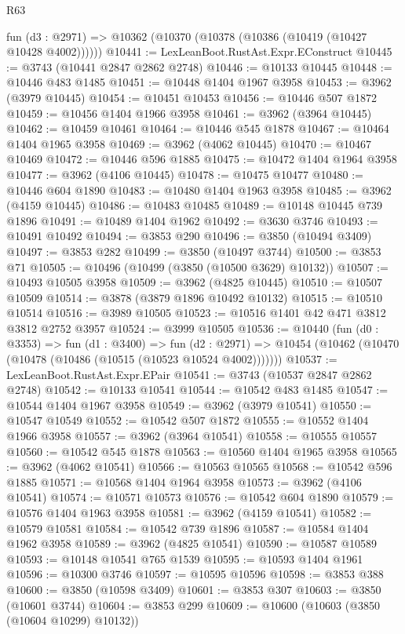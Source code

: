 \begin{lexlean}{R63}
\begin{coremodule}
    fun (d3 : @2971) => @10362 (@10370 (@10378 (@10386 (@10419 (@10427 @10428 @4002))))))
@10441 := LexLeanBoot.RustAst.Expr.EConstruct
@10445 := @3743 (@10441 @2847 @2862 @2748)
@10446 := @10133 @10445
@10448 := @10446 @483 @1485
@10451 := @10448 @1404 @1967 @3958
@10453 := @3962 (@3979 @10445)
@10454 := @10451 @10453
@10456 := @10446 @507 @1872
@10459 := @10456 @1404 @1966 @3958
@10461 := @3962 (@3964 @10445)
@10462 := @10459 @10461
@10464 := @10446 @545 @1878
@10467 := @10464 @1404 @1965 @3958
@10469 := @3962 (@4062 @10445)
@10470 := @10467 @10469
@10472 := @10446 @596 @1885
@10475 := @10472 @1404 @1964 @3958
@10477 := @3962 (@4106 @10445)
@10478 := @10475 @10477
@10480 := @10446 @604 @1890
@10483 := @10480 @1404 @1963 @3958
@10485 := @3962 (@4159 @10445)
@10486 := @10483 @10485
@10489 := @10148 @10445 @739 @1896
@10491 := @10489 @1404 @1962
@10492 := @3630 @3746
@10493 := @10491 @10492
@10494 := @3853 @290
@10496 := @3850 (@10494 @3409)
@10497 := @3853 @282
@10499 := @3850 (@10497 @3744)
@10500 := @3853 @71
@10505 := @10496 (@10499 (@3850 (@10500 @3629) @10132))
@10507 := @10493 @10505 @3958
@10509 := @3962 (@4825 @10445)
@10510 := @10507 @10509
@10514 := @3878 (@3879 @1896 @10492 @10132)
@10515 := @10510 @10514
@10516 := @3989 @10505
@10523 := @10516 @1401 @42 @471 @3812 @3812 @2752 @3957
@10524 := @3999 @10505
@10536 := @10440
    (fun (d0 : @3353) =>
    fun (d1 : @3400) =>
    fun (d2 : @2971) => @10454 (@10462 (@10470 (@10478 (@10486 (@10515 (@10523 @10524 @4002)))))))
@10537 := LexLeanBoot.RustAst.Expr.EPair
@10541 := @3743 (@10537 @2847 @2862 @2748)
@10542 := @10133 @10541
@10544 := @10542 @483 @1485
@10547 := @10544 @1404 @1967 @3958
@10549 := @3962 (@3979 @10541)
@10550 := @10547 @10549
@10552 := @10542 @507 @1872
@10555 := @10552 @1404 @1966 @3958
@10557 := @3962 (@3964 @10541)
@10558 := @10555 @10557
@10560 := @10542 @545 @1878
@10563 := @10560 @1404 @1965 @3958
@10565 := @3962 (@4062 @10541)
@10566 := @10563 @10565
@10568 := @10542 @596 @1885
@10571 := @10568 @1404 @1964 @3958
@10573 := @3962 (@4106 @10541)
@10574 := @10571 @10573
@10576 := @10542 @604 @1890
@10579 := @10576 @1404 @1963 @3958
@10581 := @3962 (@4159 @10541)
@10582 := @10579 @10581
@10584 := @10542 @739 @1896
@10587 := @10584 @1404 @1962 @3958
@10589 := @3962 (@4825 @10541)
@10590 := @10587 @10589
@10593 := @10148 @10541 @765 @1539
@10595 := @10593 @1404 @1961
@10596 := @10300 @3746
@10597 := @10595 @10596
@10598 := @3853 @388
@10600 := @3850 (@10598 @3409)
@10601 := @3853 @307
@10603 := @3850 (@10601 @3744)
@10604 := @3853 @299
@10609 := @10600 (@10603 (@3850 (@10604 @10299) @10132))

\end{coremodule}
\end{lexlean}
